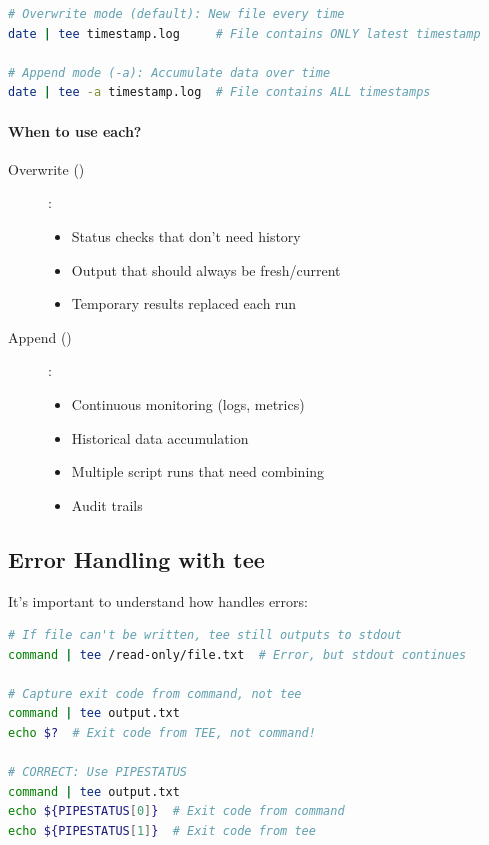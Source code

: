 \begin{lstlisting}[language=bash, caption={Overwrite vs Append}]
# Overwrite mode (default): New file every time
date | tee timestamp.log     # File contains ONLY latest timestamp

# Append mode (-a): Accumulate data over time
date | tee -a timestamp.log  # File contains ALL timestamps
\end{lstlisting}

\paragraph{When to use each?}

\begin{description}
	\item[Overwrite ()]:
	      \begin{itemize}
		      \item Status checks that don't need history
		      \item Output that should always be fresh/current
		      \item Temporary results replaced each run
	      \end{itemize}

	\item[Append ()]:
	      \begin{itemize}
		      \item Continuous monitoring (logs, metrics)
		      \item Historical data accumulation
		      \item Multiple script runs that need combining
		      \item Audit trails
	      \end{itemize}
\end{description}

\subsection{Error Handling with tee}

It's important to understand how  handles errors:

\begin{lstlisting}[language=bash, caption={Error handling with tee}]
# If file can't be written, tee still outputs to stdout
command | tee /read-only/file.txt  # Error, but stdout continues

# Capture exit code from command, not tee
command | tee output.txt
echo $?  # Exit code from TEE, not command!

# CORRECT: Use PIPESTATUS
command | tee output.txt
echo ${PIPESTATUS[0]}  # Exit code from command
echo ${PIPESTATUS[1]}  # Exit code from tee
\end{lstlisting}

